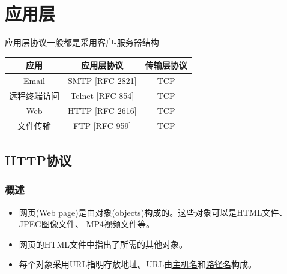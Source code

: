 
\section{应用层}
应用层协议一般都是采用客户-服务器结构
\begin{center}
\begin{tabular}{|c|c|c|}\hline
应用 & 应用层协议 & 传输层协议\\\hline
Email & SMTP [RFC 2821] & TCP \\\hline
远程终端访问 & Telnet [RFC 854] & TCP\\\hline
Web & HTTP [RFC 2616] & TCP\\\hline
文件传输 & FTP [RFC 959] & TCP\\\hline
\end{tabular}
\end{center}

\subsection{HTTP协议}
\subsubsection{概述}
\begin{itemize}
\item 网页(Web page)是由对象(objects)构成的。这些对象可以是HTML文件、 JPEG图像文件、 MP4视频文件等。
\item 网页的HTML文件中指出了所需的其他对象。
\item 每个对象采用URL指明存放地址。URL由\underline{主机名}和\underline{路径名}构成。
\end{itemize}

